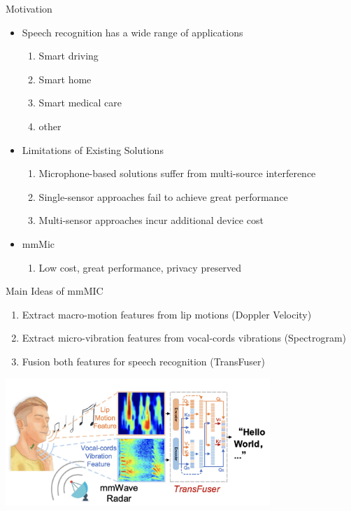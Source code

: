 \documentclass[dvipsnames, handout]{beamer}
\newcommand{\1}{\mathds{1}}	%
\begin{document}
\begin{frame}[t]{Motivation}

\begin{itemize}
\item Speech recognition has a wide range of applications
\begin{enumerate}
\item Smart driving 
\item Smart home
\item Smart medical care
\item other
\end{enumerate}

\item Limitations of Existing Solutions
\begin{enumerate}
\item Microphone-based solutions suffer from multi-source interference 
\item Single-sensor approaches fail to achieve great performance
\item Multi-sensor approaches incur additional device cost
\end{enumerate}


\item mmMic
\begin{enumerate}
\item Low cost, great performance, privacy preserved
\end{enumerate}
\end{itemize}
\end{frame}

\begin{frame}[t]{Main Ideas of mmMIC}

\begin{enumerate}
\item Extract macro-motion features from lip motions (Doppler Velocity)
\item Extract micro-vibration features from vocal-cords vibrations (Spectrogram)
\item Fusion both features for speech recognition (TransFuser)
\end{enumerate}

\begin{center}
\includegraphics[width=0.75\textwidth]{imgs/mmmic-fig1.png}
\end{center}

\end{frame}
\end{document}
